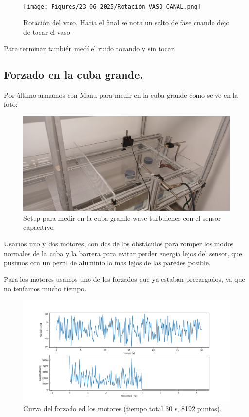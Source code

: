 \begin{figure}[th!]
	\centering
	\texttt{[image: Figures/23\_06\_2025/Rotación\_VASO\_CANAL.png]}
	\caption{Rotación del vaso. Hacia el final se nota un salto de fase cuando dejo de tocar el vaso.}
	\label{fig:rotadovasocanal}
\end{figure}


Para terminar también medí el ruido tocando y sin tocar.


\subsection*{Forzado en la cuba grande.}
Por último armamos con Manu para medir en la cuba grande como se ve en la foto:

\begin{figure}[th!]
	\centering
	\includegraphics[width=0.87\linewidth]{Figures/23_06_2025/Cuba_forzado_y_sensor}
	\caption{Setup para medir en la cuba grande wave turbulence con el sensor capacitivo. } %
	\label{fig:cubaforzadoysensor}
\end{figure}


Usamos uno y dos motores, con dos de los obstáculos para romper los modos normales de la cuba y la barrera para evitar perder energía lejos del sensor, que pusimos con un perfil de aluminio lo más lejos de las paredes posible.

Para los motores usamos uno de los forzados que ya estaban precargados, ya que no teníamos mucho tiempo. 

\begin{figure}[th!]
	\centering
	\includegraphics[width=0.87\linewidth]{"Figures/23_06_2025/Forzado de los motores"}
	\caption{Curva del forzado ed los motores (tiempo total 30 s, 8192 puntos).}
	\label{fig:forzado-de-los-motores}
\end{figure}

